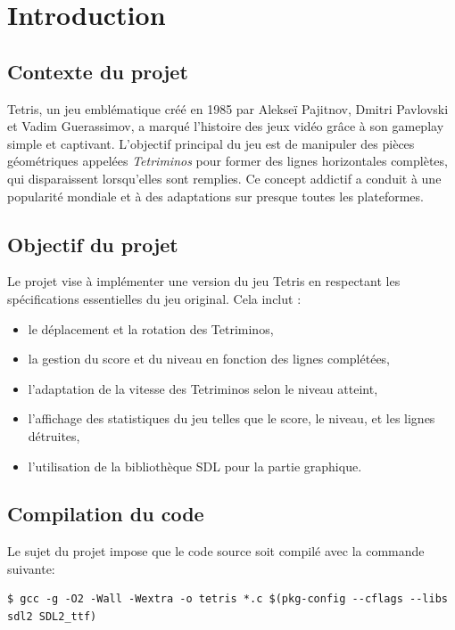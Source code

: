 \documentclass[12pt,a4paper]{report}
\begin{document}
\tableofcontents
    \thispagestyle{fancy}


\newpage
\chapter{Introduction}

\section{Contexte du projet}
Tetris, un jeu emblématique créé en 1985 par Alekseï Pajitnov, Dmitri Pavlovski et Vadim Guerassimov, a marqué l’histoire des jeux vidéo grâce à son gameplay simple et captivant. L’objectif principal du jeu est de manipuler des pièces géométriques appelées \emph{Tetriminos} pour former des lignes horizontales complètes, qui disparaissent lorsqu’elles sont remplies. Ce concept addictif a conduit à une popularité mondiale et à des adaptations sur presque toutes les plateformes.

\section{Objectif du projet}
Le projet vise à implémenter une version du jeu Tetris en respectant les spécifications essentielles du jeu original. Cela inclut :
\begin{itemize}
    \item le déplacement et la rotation des Tetriminos,
    \item la gestion du score et du niveau en fonction des lignes complétées,
    \item l’adaptation de la vitesse des Tetriminos selon le niveau atteint,
    \item l’affichage des statistiques du jeu telles que le score, le niveau, et les lignes détruites,
    \item l’utilisation de la bibliothèque SDL pour la partie graphique.
\end{itemize}
\section{Compilation du code}
Le sujet du projet impose que le code source soit compilé avec la commande suivante:

\begin{lstlisting}
$ gcc -g -O2 -Wall -Wextra -o tetris *.c $(pkg-config --cflags --libs sdl2 SDL2_ttf)
\end{lstlisting}
\end{document}
